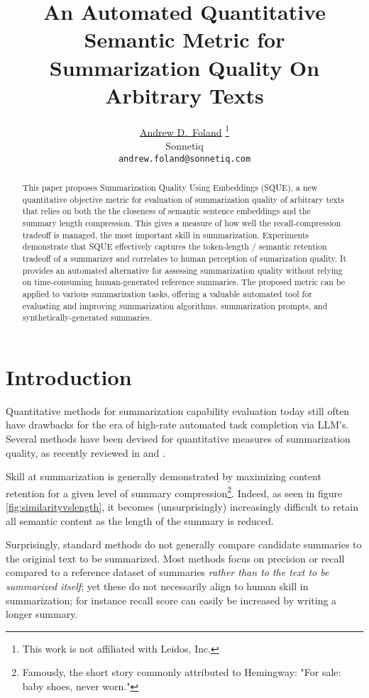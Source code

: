 \documentclass{article}
\title{An Automated Quantitative Semantic Metric for Summarization Quality On Arbitrary Texts}
\author{ 
	\href{}{
		\hspace{1mm}
		Andrew D.~Foland}
	\thanks{This work is not affiliated with Leidos, Inc.
	} \\
	Sonnetiq\\
	\texttt{andrew.foland@sonnetiq.com} \\
}
\date{}
\begin{document}
\maketitle

\begin{abstract}
This paper proposes Summarization Quality Using Embeddings (SQUE), a new quantitative objective metric for evaluation of summarization quality of arbitrary texts that relies on both the the closeness of semantic sentence embeddings and the summary length compression. 
This gives a measure of how well the recall-compression tradeoff is managed,
the most important skill in summarization.
Experiments demonstrate that SQUE effectively captures the token-length / semantic retention tradeoff of a summarizer and correlates to human perception of sumarization quality. 
It provides an automated alternative for assessing summarization quality without relying on time-consuming human-generated reference summaries. 
The proposed metric can be applied to various summarization tasks, offering a valuable automated tool for evaluating and improving summarization algorithms. summarization prompts, and synthetically-generated summaries.
\end{abstract}




\section{Introduction}
Quantitative methods for summarization capability evaluation today still often have drawbacks for the era of high-rate automated task completion via LLM's.
Several methods have been devised for quantitative measures of summarization quality, as recently reviewed in \cite{2023arXiv230504853R} and \cite{fabbri_summeval_2021}. 

Skill at summarization is generally demonstrated by maximizing content retention for a given level of summary compression\footnote{Famously, the short story commonly attributed to Hemingway: "For sale: baby shoes, never worn."}.  
Indeed, as seen in figure \ref{fig:similarityvslength}, it becomes (unsurprisingly) increasingly difficult to retain all semantic content as the length of the summary is reduced.

Surprisingly, standard methods do not generally compare candidate summaries to the original text to be summarized.
Most methods focus on precision or recall compared to a reference dataset of summaries \textit{rather than to the text to be summarized itself}; yet these do not necessarily align to human skill in summarization; for instance recall score can easily be increased by writing a longer summary.  
\end{document}
